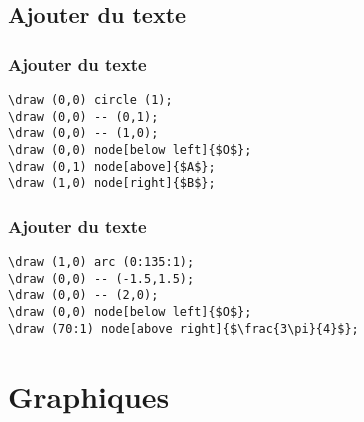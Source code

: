 \documentclass{clic_latex_beamer}
\begin{document}
\subsection{Ajouter du texte}
\begin{frame}[fragile]
\frametitle{Ajouter du texte}
\centering


\pause

\begin{lstlisting}
\draw (0,0) circle (1);
\draw (0,0) -- (0,1);
\draw (0,0) -- (1,0);
\draw (0,0) node[below left]{$O$};
\draw (0,1) node[above]{$A$};
\draw (1,0) node[right]{$B$};
\end{lstlisting}

\end{frame}

\begin{frame}[fragile]
\frametitle{Ajouter du texte}
\centering


\begin{lstlisting}
\draw (1,0) arc (0:135:1);
\draw (0,0) -- (-1.5,1.5);
\draw (0,0) -- (2,0);
\draw (0,0) node[below left]{$O$};
\draw (70:1) node[above right]{$\frac{3\pi}{4}$};
\end{lstlisting} 

\end{frame}
 

\section{Graphiques}
\end{document}
